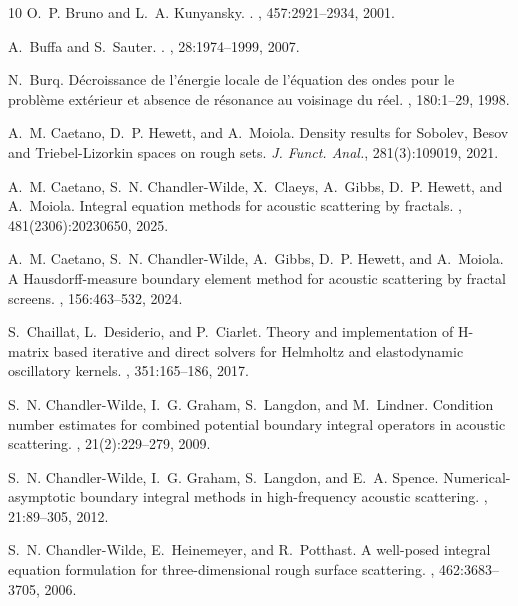 \documentclass{birkjour}
\theoremstyle{definition}
\theoremstyle{remark}
\numberwithin{equation}{section}
\begin{document}
\begin{thebibliography}{10}
O.~P. Bruno and L.~A. Kunyansky.
.
, 457:2921--2934, 2001.

A.~Buffa and S.~Sauter.
.
, 28:1974--1999, 2007.

N.~Burq.
\newblock D\'ecroissance de l'\'energie locale de l’\'equation des ondes pour
  le probl\`eme ext\'erieur et absence de r\'esonance au voisinage du r\'eel.
, 180:1--29, 1998.

A.~M. Caetano, D.~P. Hewett, and A.~Moiola.
\newblock Density results for {S}obolev, {B}esov and
{T}riebel-{L}izorkin spaces on rough sets.
{\em J. Funct. Anal.}, 281(3):109019, 2021.

A.~M. Caetano, S.~N. Chandler-Wilde, X.~Claeys, A.~Gibbs, D.~P. Hewett, and
  A.~Moiola.
\newblock Integral equation methods for acoustic scattering by fractals.
, 481(2306):20230650, 2025.

A.~M. Caetano, S.~N. Chandler-Wilde, A.~Gibbs, D.~P. Hewett, and A.~Moiola.
\newblock A {H}ausdorff-measure boundary element method for acoustic scattering
  by fractal screens.
, 156:463--532, 2024.

S.~Chaillat, L.~Desiderio, and P.~Ciarlet.
\newblock Theory and implementation of {H}-matrix based iterative and direct
  solvers for {H}elmholtz and elastodynamic oscillatory kernels.
, 351:165--186, 2017.

S.~N. Chandler-Wilde, I.~G. Graham, S.~Langdon, and M.~Lindner.
\newblock Condition number estimates for combined potential boundary integral
  operators in acoustic scattering.
, 21(2):229--279, 2009.

S.~N. Chandler-Wilde, I.~G. Graham, S.~Langdon, and E.~A. Spence.
\newblock Numerical-asymptotic boundary integral methods in high-frequency
  acoustic scattering.
, 21:89--305, 2012.

S.~N. Chandler-Wilde, E.~Heinemeyer, and R.~Potthast.
\newblock A well-posed integral equation formulation for three-dimensional
  rough surface scattering.
, 462:3683--3705, 2006.


\end{thebibliography}
\end{document}

